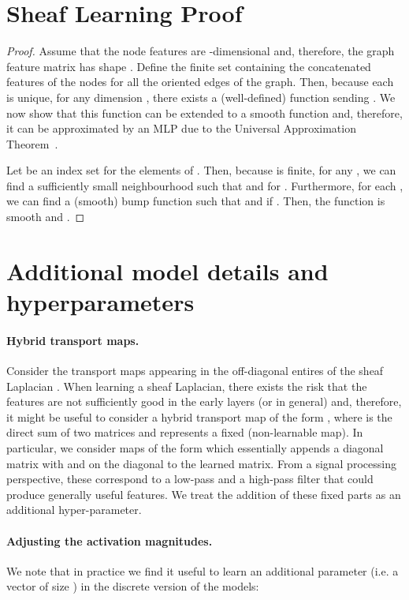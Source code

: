 \documentclass{article}
\begin{document}
\section{Sheaf Learning Proof}

\SheafLearning*
\begin{proof}
Assume that the node features are -dimensional and, therefore, the graph feature matrix has shape . Define the finite set  containing the concatenated features of the nodes for all the oriented edges  of the graph. Then, because each  is unique, for any dimension , there exists a (well-defined) function  sending . We now show that this function can be extended to a smooth function  and, therefore, it can be approximated by an MLP due to the Universal Approximation Theorem~\citep{hornik1989multilayer, hornik1991approximation}.

Let  be an index set for the elements of . Then, because  is finite, for any , we can find a sufficiently small neighbourhood  such that  and  for . Furthermore, for each , we can find a (smooth) bump function  such that  and  if . Then, the function  is smooth and .
\end{proof}

\section{Additional model details and hyperparameters}\label{app:hyperparams}

\paragraph{Hybrid transport maps.} Consider the transport maps  appearing in the off-diagonal entires of the sheaf Laplacian . When learning a sheaf Laplacian, there exists the risk that the features are not sufficiently good in the early layers (or in general) and, therefore, it might be useful to consider a hybrid transport map of the form , where  is the direct sum of two matrices and  represents a fixed (non-learnable map). In particular, we consider maps of the form  which essentially appends a diagonal matrix with  and  on the diagonal to the learned matrix. From a signal processing perspective, these correspond to a low-pass and a high-pass filter that could produce generally useful features. We treat the addition of these fixed parts as an additional hyper-parameter.  

\paragraph{Adjusting the activation magnitudes.} We note that in practice we find it useful to learn an additional parameter  (i.e. a vector of size ) in the discrete version of the models:
\end{document}
